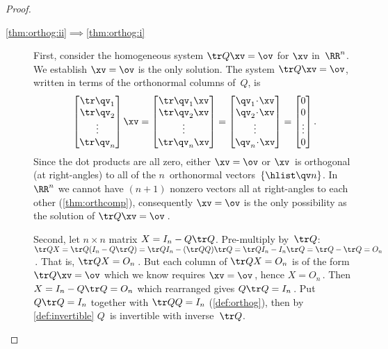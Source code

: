 \begin{proof}
\begin{description}
\item[\ref{thm:orthog:ii}$\implies$\ref{thm:orthog:i}] 
First, consider the homogeneous system \(\tr Q\xv=\ov\) for \(\xv\) in~\(\RR^n\).
We establish \(\xv=\ov\) is the only solution.
The system \(\tr Q\xv=\ov\), written in terms of the orthonormal columns of~\(Q\), is 
\begin{equation*}
\begin{bmatrix} \tr\qv_1\\\tr\qv_2\\\vdots\\\tr\qv_n \end{bmatrix}\xv
=\begin{bmatrix} \tr\qv_1\xv\\\tr\qv_2\xv\\\vdots\\\tr\qv_n\xv \end{bmatrix}
=\begin{bmatrix} \qv_1\cdot\xv\\\qv_2\cdot\xv\\\vdots\\\qv_n\cdot\xv \end{bmatrix}
=\begin{bmatrix} 0\\0\\\vdots\\0 \end{bmatrix}.
\end{equation*}
Since the dot products are all zero, either \(\xv=\ov\) or \(\xv\)~is 
orthogonal (at right-angles) to all of the \(n\)~orthonormal vectors~\(\{\hlist\qv n\}\).
In~\(\RR^n\) we cannot have \((n+1)\) nonzero vectors all at right-angles to each other (\autoref{thm:orthcomp}), consequently \(\xv=\ov\) is the only possibility as the solution of \(\tr Q\xv=\ov\)\,.

Second, let \(n\times n\) matrix \(X=I_n-Q\tr Q\).
Pre-multiply by~\(\tr Q\): \(\tr QX
=\tr Q(I_n-Q\tr Q)
=\tr QI_n-(\tr QQ)\tr Q
=\tr QI_n-I_n\tr Q
=\tr Q-\tr Q
=O_n\)\,.
That is, \(\tr QX=O_n\)\,. 
But each column of \(\tr QX=O_n\) is of the form \(\tr Q\xv=\ov\) which we know requires \(\xv=\ov\)\,, hence \(X=O_n\)\,.
Then \(X=I_n-Q\tr Q=O_n\) which rearranged gives \(Q\tr Q=I_n\)\,. 
Put \(Q\tr Q=I_n\) together with \(\tr QQ=I_n\) (\autoref{def:orthog}),  then by \autoref{def:invertible}  \(Q\)~is invertible with inverse~\(\tr Q\).


\end{description}
\end{proof}
